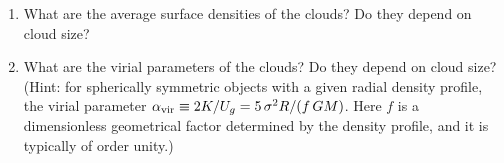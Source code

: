 \documentclass[12pt, letterpaper]{article}
\newcommand{\pc}{\mbox{$\rm pc$}}
\newcommand{\kms}{\mbox{$\rm km\,s^{-1}$}}
\newcommand{\Msun}{\mbox{$\rm M_\odot$}}
\begin{document}
\begin{enumerate}

\item What are the average surface densities of the clouds? Do they depend on cloud size?



\item What are the virial parameters of the clouds? Do they depend on cloud size? (Hint: for spherically symmetric objects with a given radial density profile, the virial parameter $\alpha_{\rm vir} \equiv 2K/U_g = 5\,\sigma^2 R/(f\,G M)$. Here $f$ is a dimensionless geometrical factor determined by the density profile, and it is typically of order unity.)




\end{enumerate}
\end{document}
